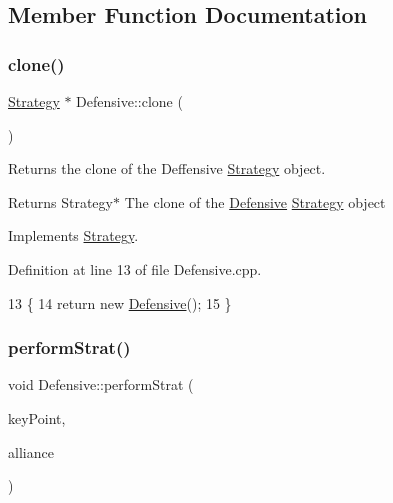 \subsection{Member Function Documentation}
\mbox{\label{classDefensive_afad21efc8bf51879f85f9d02e695cfa6}} 
\subsubsection{\texorpdfstring{clone()}{clone()}}
{\footnotesize\ttfamily \hyperlink{classStrategy}{Strategy} $\ast$ Defensive\+::clone (\begin{DoxyParamCaption}{ }\end{DoxyParamCaption})\hspace{0.3cm}{\ttfamily [virtual]}}



Returns the clone of the Deffensive \hyperlink{classStrategy}{Strategy} object. 

\begin{DoxyReturn}{Returns}
Strategy$\ast$ The clone of the \hyperlink{classDefensive}{Defensive} \hyperlink{classStrategy}{Strategy} object 
\end{DoxyReturn}


Implements \hyperlink{classStrategy_aaed20ba057db079ae2bc41b19b009211}{Strategy}.



Definition at line 13 of file Defensive.\+cpp.


\begin{DoxyCode}
13                            \{
14     \textcolor{keywordflow}{return} \textcolor{keyword}{new} \hyperlink{classDefensive}{Defensive}();
15 \}
\end{DoxyCode}
\mbox{\label{classDefensive_a4cc4f2f71160bcade2cf2be8ade39903}} 
\subsubsection{\texorpdfstring{perform\+Strat()}{performStrat()}}
{\footnotesize\ttfamily void Defensive\+::perform\+Strat (\begin{DoxyParamCaption}\item[{Key\+Point $\ast$}]{key\+Point,  }\item[{Alliance $\ast$}]{alliance }\end{DoxyParamCaption})\hspace{0.3cm}{\ttfamily [virtual]}}



